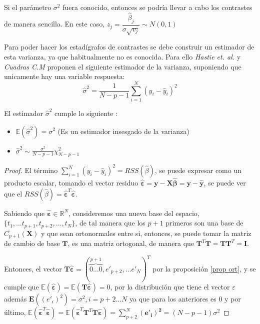 \noindent Si el parámetro $\sigma^2$ fuera conocido, entonces se podría llevar a cabo los contrastes de manera sencilla. En este caso, $z_j=\dfrac{\hat{\beta}_j}{\sigma \sqrt{v_j}}\sim N(0,1)$

\noindent Para poder hacer los estadígrafos de contrastes se debe construir un estimador de esta varianza, ya que habitualmente no es conocida. Para ello \emph{Hastie et. al.}\cite{Hastie 2001} y \emph{Cuadras C.M} \cite{Cuadras 2014} proponen el siguiente estimador de la varianza, suponiendo que unicamente hay una variable respuesta: 
\begin{equation}
\hat{\sigma}^2=\dfrac{1}{N-p-1}\sum_{i=1}^N (y_i-\hat{y}_i)^2 
\end{equation} 


\begin{propo}
El estimador $\hat{\sigma}^2$ cumple lo siguiente :
\begin{itemize}
\item $\mathbb{E}(\hat{\sigma} ^2)=\sigma^2$ (Es un estimador insesgado de la varianza)
\item  $\hat{\sigma}^2 \sim \frac{\sigma^2}{N-p-1}\chi_{N-p-1}^2 $
\end{itemize}
\begin{proof}
El término $\sum_{i=1}^N (y_i-\hat{y}_i)^2=RSS(\hat{\beta})$, se puede expresar como un producto escalar, tomando el vector residuo $\hat{\mathbf{\varepsilon}}= \mathbf{y}-\mathbf{X \hat{\beta}}=\mathbf{y}-\mathbf{\hat{y}}$, se puede ver que el $RSS(\hat{\beta})=\hat{\mathbf{\varepsilon}}^T\hat{\mathbf{\varepsilon}}$. 

\noindent Sabiendo que $\mathbf{\hat{\varepsilon}}\in \mathbb{R}^N$, consideremos una nueva base del espacio, $\lbrace t_1,\ldots t_{p+1},t_{p+2},\ldots, t_N \rbrace$, de tal manera que los $p+1$ primeros son una base de $C_{p+1}(\mathbf{X})$ y que sean ortonormales entre si, entonces, se puede tomar la matriz de cambio de base $\mathbf{T}$, es una matriz ortogonal, de manera que 
$\mathbf{T}^T\mathbf{T}=\mathbf{TT}^T=\mathbf{I}$. 

\noindent Entonces, el vector $\mathbf{T\hat{\varepsilon}}=(\overbrace{0\ldots 0}^{p+1},e'_{p+2},\ldots e'_{N})^T$ por la proposición \ref{prop ort}, y se cumple que $\mathbb{E}(\mathbf{\hat{\varepsilon}})=\mathbb{E}(\mathbf{T\hat{\varepsilon}})=0$, por la distribución que tiene el vector $\varepsilon$ además $\mathbf{E}((e'_i)^2)=\sigma^2, i=p+2\ldots N $ ya que para los anteriores es 0 y por último, $\mathbb{E}(\mathbf{\hat{\varepsilon}}^T\mathbf{\hat{\varepsilon}})=\mathbb{E}(\mathbf{\hat{\varepsilon}}^T\mathbf{T}^T\mathbf{T}\mathbf{\hat{\varepsilon}})=\sum_{p+2}^N \mathbf{(e'_i)^2}=(N-p-1) \sigma^2$


\end{proof}
\end{propo}
